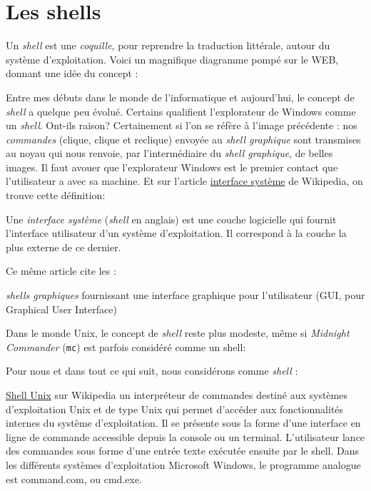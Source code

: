 
\section{Les shells}

Un \emph{shell} est une \emph{coquille}, pour reprendre la traduction littérale, autour du système d'exploitation. Voici un magnifique diagramme pompé sur le WEB, donnant une idée du concept :

Entre mes débuts dans le monde de l'informatique et aujourd'hui, le concept de \emph{shell} a quelque peu évolué. Certains qualifient l'explorateur de Windows comme un \emph{shell}. Ont-ils raison? Certainement si l'on se réfère à l'image précédente : nos \emph{commandes} (clique, clique et reclique) envoyée au \emph{shell graphique} sont transmises au noyau qui nous renvoie, par l'intermédiaire du \emph{shell graphique}, de belles images. Il faut avouer que l'explorateur Windows est le premier contact que l'utilisateur a avec sa machine.  Et sur l'article \href{http://fr.wikipedia.org/wiki/Interface_syst%C3%A8me}{interface système} de Wikipedia, on trouve cette définition:

\begin{Quote}
Une \emph{interface système }(\emph{shell} en anglais) est une couche logicielle qui fournit l'interface utilisateur d'un système d'exploitation. Il correspond à la couche la plus externe de ce dernier.
\end{Quote}

Ce même article cite les :
\begin{Quote}
\emph{shells graphiques} fournissant une interface graphique pour l'utilisateur (GUI, pour Graphical User Interface)
\end{Quote}



Dans le monde Unix, le concept de \emph{shell} reste plus modeste, même si \emph{Midnight Commander} (\texttt{mc}) est parfois considéré comme un shell:

Pour nous et dans tout ce qui suit, nous considérons comme \emph{shell} :



\begin{Quotebis}{\href{http://fr.wikipedia.org/wiki/Shell_Unix}{Shell Unix} sur Wikipedia}
un interpréteur de commandes destiné aux systèmes d'exploitation Unix et de type Unix qui permet d'accéder aux fonctionnalités internes du système d'exploitation. Il se présente sous la forme d'une interface en ligne de commande accessible depuis la console ou un terminal. L'utilisateur lance des commandes sous forme d'une entrée texte exécutée ensuite par le shell. Dans les différents systèmes d'exploitation Microsoft Windows, le programme analogue est command.com, ou cmd.exe.
\end{Quotebis}


